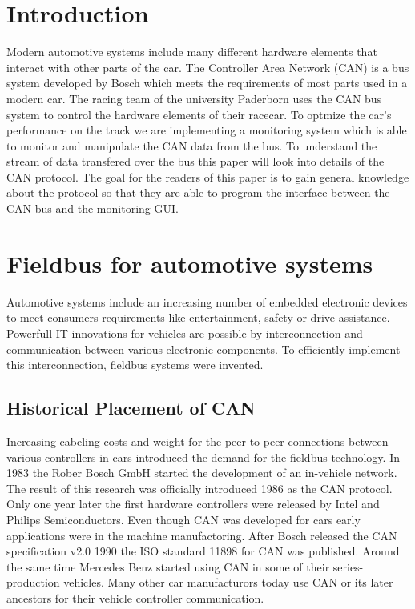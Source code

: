 \nocite{can2spec}
\nocite{canbook1}
\nocite{vector:2012:online}

\section{Introduction}
Modern automotive systems include many different hardware elements that interact
with other parts of the car. The Controller Area Network (CAN) is a bus system
developed by Bosch which meets the requirements of most parts used in a modern
car. The racing team of the university Paderborn uses the CAN bus system to
control the hardware elements of their racecar. To optmize the car's performance
on the track we are implementing a monitoring system which is able to monitor
and manipulate the CAN data from the bus. To understand the stream of data
transfered over the bus this paper will look into details of the CAN protocol.
The goal for the readers of this paper is to gain general knowledge about the
protocol so that they are able to program the interface between the CAN bus and
the monitoring GUI.

\section{Fieldbus for automotive systems}
Automotive systems include an increasing number of embedded electronic devices
to meet consumers requirements like entertainment, safety or drive assistance.
Powerfull IT innovations for vehicles are possible by interconnection and
communication between various electronic components. To efficiently implement
this interconnection, fieldbus systems were invented. 
	
	\cite{can-florian-rathgeber} 
	\subsection{Historical Placement of CAN} 
	Increasing cabeling costs and weight for the peer-to-peer
	connections between various controllers in cars introduced the demand for the
	fieldbus technology. In 1983 the Rober Bosch GmbH started the development of an
	in-vehicle network. The result of this research was officially introduced 1986
	as the CAN protocol. Only one year later the first hardware controllers were
	released by Intel and Philips Semiconductors. Even though CAN was developed for
	cars early applications were in the machine manufactoring. After Bosch released
	the CAN specification v2.0 1990 the ISO standard 11898 for CAN was published.
	Around the same time Mercedes Benz started using CAN in some of their
	series-production vehicles. Many other car manufacturors today use CAN or its
	later ancestors for their vehicle controller communication.
	

